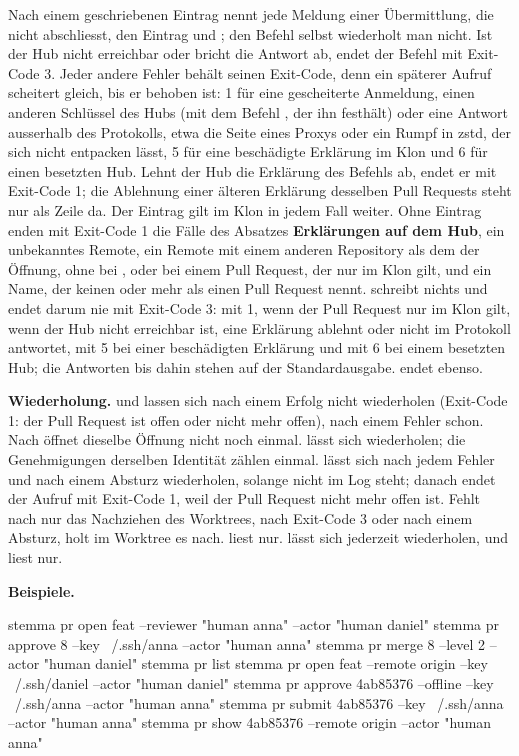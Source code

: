 Nach einem geschriebenen Eintrag nennt jede Meldung einer Übermittlung, die nicht abschliesst,
den Eintrag und ; den Befehl selbst wiederholt man nicht. Ist der
Hub nicht erreichbar oder bricht die Antwort ab, endet der Befehl mit Exit-Code 3. Jeder andere
Fehler behält seinen Exit-Code, denn ein späterer Aufruf scheitert gleich, bis er behoben ist: 1
für eine gescheiterte Anmeldung, einen anderen Schlüssel des Hubs (mit dem Befehl
, der ihn festhält) oder eine Antwort ausserhalb des Protokolls, etwa die Seite
eines Proxys oder ein Rumpf in zstd, der sich nicht entpacken lässt, 5 für eine beschädigte
Erklärung im Klon und 6 für einen besetzten Hub. Lehnt der Hub die Erklärung des Befehls ab,
endet er mit Exit-Code 1; die Ablehnung einer älteren Erklärung desselben Pull Requests steht
nur als Zeile da. Der Eintrag gilt im Klon in jedem Fall weiter. Ohne Eintrag enden mit
Exit-Code 1 die Fälle des Absatzes {\bf Erklärungen auf dem Hub}, ein unbekanntes Remote, ein
Remote mit einem anderen Repository als dem der Öffnung,
 ohne  bei ,  oder  bei
einem Pull Request, der nur im Klon gilt, und ein Name, der keinen oder mehr als einen Pull
Request nennt.  schreibt nichts und endet darum nie mit Exit-Code 3: mit 1, wenn
der Pull Request nur im Klon gilt, wenn der Hub nicht erreichbar ist, eine Erklärung ablehnt
oder nicht im Protokoll antwortet, mit 5 bei einer beschädigten Erklärung und mit 6 bei einem
besetzten Hub; die Antworten bis dahin stehen auf der Standardausgabe.  endet ebenso.

{\bf Wiederholung.}  und  lassen sich nach einem Erfolg nicht wiederholen
(Exit-Code 1: der Pull Request ist offen oder nicht mehr offen), nach einem Fehler schon.
Nach  öffnet  dieselbe Öffnung nicht noch einmal.
 lässt sich wiederholen; die Genehmigungen derselben Identität zählen einmal.
 lässt sich nach jedem Fehler und nach einem Absturz wiederholen, solange
 nicht im Log steht; danach
endet der Aufruf mit Exit-Code 1, weil der Pull Request nicht mehr offen ist.
Fehlt nach  nur das Nachziehen des Worktrees, nach Exit-Code 3 oder nach einem
Absturz, holt  im Worktree es nach.
 liest nur.
 lässt sich jederzeit wiederholen, und  liest nur.

{\bf Beispiele.}

\starttyping
stemma pr open feat --reviewer "human anna" --actor "human daniel"
stemma pr approve 8 --key ~/.ssh/anna --actor "human anna"
stemma pr merge 8 --level 2 --actor "human daniel"
stemma pr list
stemma pr open feat --remote origin --key ~/.ssh/daniel --actor "human daniel"
stemma pr approve 4ab85376 --offline --key ~/.ssh/anna --actor "human anna"
stemma pr submit 4ab85376 --key ~/.ssh/anna --actor "human anna"
stemma pr show 4ab85376 --remote origin --actor "human anna"
\stoptyping

